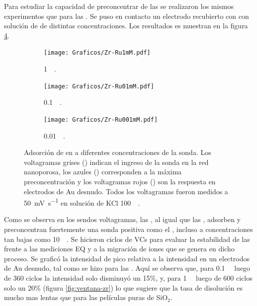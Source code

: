 		 	Para estudiar la capacidad de preconcentrar de las \pdmZ\space se realizaron los mismos experimentos que para las \pdmF. Se puso en contacto un electrodo recubierto con \pdmZ\space con solución de \ru\space de distintas concentraciones. Los resultados es muestran en la figura \ref{fig:precon_ZR}.

	 			\begin{figure}[th]
			   	    \begin{subfigure}[t]{0.325\textwidth}
			        	\texttt{[image: Graficos/Zr-Ru1mM.pdf]}
			        	\vspace*{-0.40cm}\caption{\aminorutenio\space \SI{1}{\milli\Molar}.}
			         	\label{fig:Zr-Ru1mM}
			     		\end{subfigure}
			   	    \begin{subfigure}[t]{0.325\textwidth}
			        	\texttt{[image: Graficos/Zr-Ru01mM.pdf]}
			       		\vspace*{-0.40cm}\caption{\aminorutenio\space \SI{0.1}{\milli\Molar}.}
			         	\label{fig:Zr-Ru0.1mM}
			     		\end{subfigure}
		     		\begin{subfigure}[t]{0.325\textwidth}
			        	\texttt{[image: Graficos/Zr-Ru001mM.pdf]}
			       		\vspace*{-0.40cm}\caption{\aminorutenio\space \SI{0.01}{\milli\Molar}.}
			         	\label{fig:Zr-Ru0.01mM}
			     		\end{subfigure}
			     		\caption[Preconcentración de \aminorutenio\space en \pdmZ]{Adsorción de \ru\space en \pdmZ\space a diferentes concentraciones de la sonda. Los voltagramas grises (\usebox{\gris}) indican el ingreso de la sonda en la red nanoporosa, los azules (\usebox{\azul}) corresponden a la máxima preconcentración y los voltagramas rojos (\usebox{\rojo}) son la respuesta en electrodos de Au desnudo. Todos los voltagramas fueron medidos a \SI{50}{\milli\volt\per\second} en solución de KCl \SI{100}{\milli\Molar}.}
			     		\label{fig:precon_ZR}
		     		\end{figure}
		 \newpage

		 Como se observa en los sendos voltagramas, las \pdmZ, al igual que las \pdmF, adsorben y preconcentran fuertemente una sonda positiva como el \ru,	incluso a concentraciones tan bajas como \SI{10}{\micro\Molar}. Se hicieron ciclos de VCs para evaluar la estabilidad de las \pdmZ\space frente a las mediciones EQ y a la migración de iones que se genera en dicho proceso. Se graficó la intensidad de pico relativa a la intensidad en un electrodos de Au desnudo, tal como se hizo para las \pdmF. Aquí se observa que, para \ru\space \SI{0.1}{\milli\Molar} luego de 360 ciclos la intensidad solo disminuyó un 15\%, y, para \ru\space \SI{1}{\milli\Molar} luego de 600 ciclos solo un 20\% (figura \ref{fig:ventana-zr}) lo que sugiere que la tasa de disolución es mucho mas lentas que para las películas puras de SiO$_2$.

